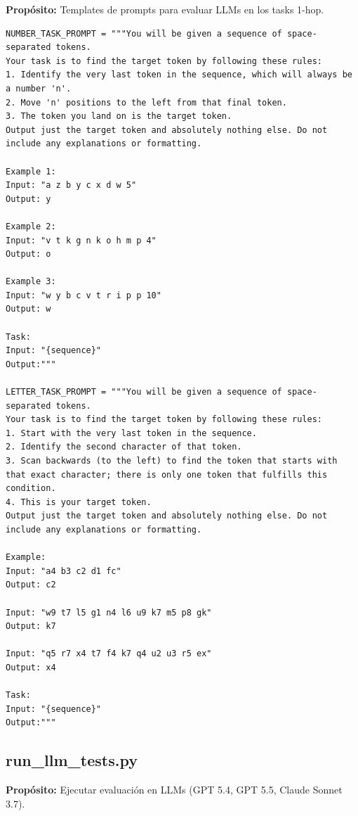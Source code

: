 \documentclass[12pt,a4paper]{report}
\begin{document}
\textbf{Propósito:} Templates de prompts para evaluar LLMs en los tasks 1-hop.

\begin{lstlisting}
NUMBER_TASK_PROMPT = """You will be given a sequence of space-separated tokens. 
Your task is to find the target token by following these rules:
1. Identify the very last token in the sequence, which will always be a number 'n'.
2. Move 'n' positions to the left from that final token.
3. The token you land on is the target token.
Output just the target token and absolutely nothing else. Do not include any explanations or formatting.

Example 1:
Input: "a z b y c x d w 5"
Output: y

Example 2:
Input: "v t k g n k o h m p 4"
Output: o

Example 3:
Input: "w y b c v t r i p p 10"
Output: w

Task:
Input: "{sequence}"
Output:"""

LETTER_TASK_PROMPT = """You will be given a sequence of space-separated tokens. 
Your task is to find the target token by following these rules:
1. Start with the very last token in the sequence.
2. Identify the second character of that token.
3. Scan backwards (to the left) to find the token that starts with that exact character; there is only one token that fulfills this condition.
4. This is your target token.
Output just the target token and absolutely nothing else. Do not include any explanations or formatting.

Example:
Input: "a4 b3 c2 d1 fc"
Output: c2

Input: "w9 t7 l5 g1 n4 l6 u9 k7 m5 p8 gk"
Output: k7

Input: "q5 r7 x4 t7 f4 k7 q4 u2 u3 r5 ex"
Output: x4

Task:
Input: "{sequence}"
Output:"""
\end{lstlisting}

\subsection{run\_llm\_tests.py}
\label{subsec:run_llm_tests}

\textbf{Propósito:} Ejecutar evaluación en LLMs (GPT 5.4, GPT 5.5, Claude Sonnet 3.7).
\end{document}

